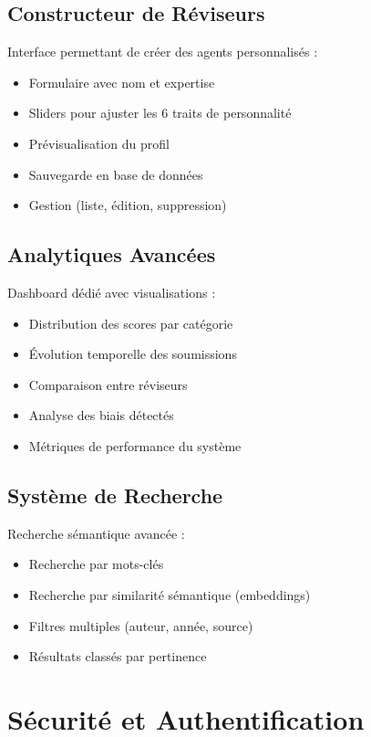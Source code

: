 \documentclass[12pt,a4paper]{article}
\begin{document}
\subsection{Constructeur de Réviseurs}

Interface permettant de créer des agents personnalisés :
\begin{itemize}
    \item Formulaire avec nom et expertise
    \item Sliders pour ajuster les 6 traits de personnalité
    \item Prévisualisation du profil
    \item Sauvegarde en base de données
    \item Gestion (liste, édition, suppression)
\end{itemize}

\subsection{Analytiques Avancées}

Dashboard dédié avec visualisations :
\begin{itemize}
    \item Distribution des scores par catégorie
    \item Évolution temporelle des soumissions
    \item Comparaison entre réviseurs
    \item Analyse des biais détectés
    \item Métriques de performance du système
\end{itemize}

\subsection{Système de Recherche}

Recherche sémantique avancée :
\begin{itemize}
    \item Recherche par mots-clés
    \item Recherche par similarité sémantique (embeddings)
    \item Filtres multiples (auteur, année, source)
    \item Résultats classés par pertinence
\end{itemize}

\section{Sécurité et Authentification}
\end{document}
